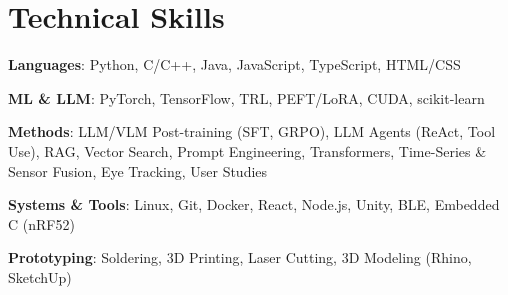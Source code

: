 \documentclass[letterpaper,11pt]{article}
\newcommand{\resumeSubHeadingListStart}{\begin{itemize}[leftmargin=*]}
\newcommand{\resumeSubHeadingListEnd}{\end{itemize}}
\begin{document}
%
\section{Technical Skills}
     \textbf{Languages}{: Python, C/C++, Java, JavaScript, TypeScript, HTML/CSS}
     \hfill

     \textbf{ML \& LLM}{: PyTorch, TensorFlow, TRL, PEFT/LoRA, CUDA, scikit-learn}
     \hfill

     \textbf{Methods}{: LLM/VLM Post-training (SFT, GRPO), LLM Agents (ReAct, Tool Use), RAG, Vector Search, Prompt Engineering, Transformers, Time-Series \& Sensor Fusion, Eye Tracking, User Studies}
     \hfill

     \textbf{Systems \& Tools}{: Linux, Git, Docker, React, Node.js, Unity, BLE, Embedded C (nRF52)}
     \hfill

     \textbf{Prototyping}{: Soldering, 3D Printing, Laser Cutting, 3D Modeling (Rhino, SketchUp)}
     \hfill
     


\end{document}
